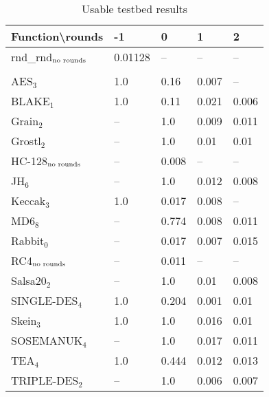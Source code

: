 \documentclass[twoside,a4paper]{article}
\begin{document}
\newcommand{\fd}{\cellcolor{red!13}}
\newcommand{\fn}{\cellcolor{green!13}}

\begin{table}[H]
\centering
\label{res_usable}
\begin{tabular}{l|l l l l}
Function\textbackslash{}rounds & -1 & 0 & 1 & 2\\ \hline
rnd\_rnd$_{\textnormal{no rounds}}$ & \fn{}0.01128 & --       & --         & --        \\\\
AES$_{3}$        & \fd{}1.0   & \fd{}0.16  & \fn{}0.007 & \fn{}--   \\
BLAKE$_{1}$      & \fd{}1.0   & \fd{}0.11  & \fn{}0.021 & \fn{}0.006\\
Grain$_{2}$      & \fd{}--    & \fd{}1.0   & \fn{}0.009 & \fn{}0.011\\
Grostl$_{2}$     & \fd{}--    & \fd{}1.0   & \fn{}0.01  & \fn{}0.01 \\
HC-128$_{\textnormal{no rounds}}$& \fd{}--    & \fn{}0.008 & \fn{}--    & \fn{}--   \\
JH$_{6}$         & \fd{}--    & \fd{}1.0   & \fn{}0.012 & \fn{}0.008\\
Keccak$_{3}$     & \fd{}1.0   & \fn{}0.017 & \fn{}0.008 & \fn{}--   \\
MD6$_{8}$        & \fd{}--    & \fd{}0.774 & \fn{}0.008 & \fn{}0.011\\
Rabbit$_{0}$     & \fd{}--    & \fn{}0.017 & \fn{}0.007 & \fn{}0.015\\
RC4$_{\textnormal{no rounds}}$& -- & \fn{}0.011 & --         & --        \\
Salsa20$_{2}$    & \fd{}--    & \fd{}1.0   & \fn{}0.01  & \fn{}0.008\\
SINGLE-DES$_{4}$ & \fd{}1.0   & \fd{}0.204 & \fn{}0.001 & \fn{}0.01 \\
Skein$_{3}$      & \fd{}1.0   & \fd{}1.0   & \fn{}0.016 & \fn{}0.01 \\
SOSEMANUK$_{4}$  & \fd{}--    & \fd{}1.0   & \fn{}0.017 & \fn{}0.011\\
TEA$_{4}$        & \fd{}1.0   & \fd{}0.444 & \fn{}0.012 & \fn{}0.013\\
TRIPLE-DES$_{2}$ & \fd{}--    & \fd{}1.0   & \fn{}0.006 & \fn{}0.007
\end{tabular}
\caption{Usable testbed results}
\end{table}
\end{document}
